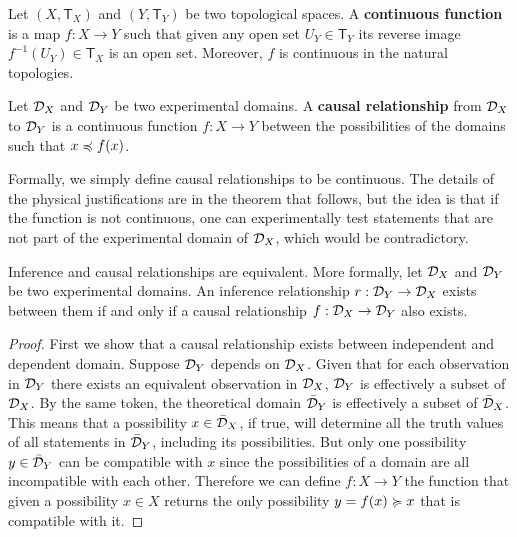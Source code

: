 \documentclass[11pt,letterpaper,fleqn]{memoir} %
\begin{document}
\begin{mathSection}
	\begin{defn}
		Let $(X, \mathsf{T}_X)$ and $(Y, \mathsf{T}_Y)$ be two topological spaces. A \textbf{continuous function} is a map $f: X \to Y$ such that given any open set $U_Y \in \mathsf{T}_Y$ its reverse image $f^{-1}(U_Y) \in \mathsf{T}_X$ is an open set. Moreover, $f$ is continuous in the natural topologies.
	\end{defn}
	\begin{defn}
		Let $\mathcal{D}_X$ and $\mathcal{D}_Y$ be two experimental domains. A \textbf{causal relationship} from $\mathcal{D}_X$ to $\mathcal{D}_Y$ is a continuous function $f : X \to Y$ between the possibilities of the domains such that $x \preccurlyeq f(x)$.
	\end{defn}
	\begin{justification}
		Formally, we simply define causal relationships to be continuous. The details of the physical justifications are in the theorem that follows, but the idea is that if the function is not continuous, one can experimentally test statements that are not part of the experimental domain of $\mathcal{D}_X$, which would be contradictory.
	\end{justification}
	\begin{thrm}
		Inference and causal relationships are equivalent. More formally, let $\mathcal{D}_X$ and $\mathcal{D}_Y$ be two experimental domains. An inference relationship $r: \mathcal{D}_Y \to \mathcal{D}_X$ exists between them if and only if a causal relationship $f: \mathcal{D}_X \to \mathcal{D}_Y$ also exists.
	\end{thrm}
	\begin{proof}
		First we show that a causal relationship exists between independent and dependent domain. Suppose $\mathcal{D}_Y$ depends on $\mathcal{D}_X$. Given that for each observation in $\mathcal{D}_Y$ there exists an equivalent observation in $\mathcal{D}_X$, $\mathcal{D}_Y$ is effectively a subset of $\mathcal{D}_X$. By the same token, the theoretical domain $\bar{\mathcal{D}}_Y$ is effectively a subset of $\bar{\mathcal{D}}_X$. This means that a possibility $x \in \bar{\mathcal{D}}_X$, if true, will determine all the truth values of  all statements in $\bar{\mathcal{D}}_Y$, including its possibilities. But only one possibility $y \in \bar{\mathcal{D}}_Y$ can be compatible with $x$ since the possibilities of a domain are all incompatible with each other. Therefore we can define $f : X \to Y$ the function that given a possibility $x \in X$ returns the only possibility $y=f(x) \succcurlyeq x$ that is compatible with it.
		

\end{proof}
\end{mathSection}
\end{document}
